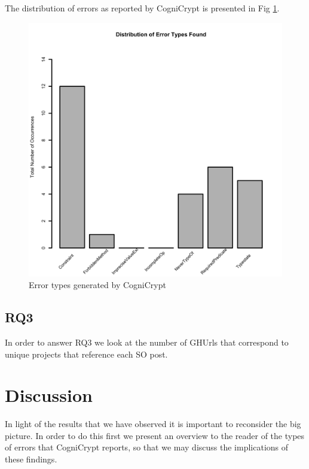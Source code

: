 \documentclass[10pt, conference]{IEEEtran}
\begin{document}
The distribution of errors as reported by CogniCrypt is presented in Fig \ref{fig:errorDistribution}.

\begin{figure}[h]
\begin{center}
\includegraphics[width=0.9\linewidth]{Dist.png}
\caption{Error types generated by CogniCrypt}
\label{fig:errorDistribution}
\end{center}
\end{figure}

\subsection{RQ3}

In order to answer RQ3 we look at the number of GHUrls that correspond to unique projects that reference each SO post. 


\section{Discussion}

In light of the results that we have observed it is important to reconsider the big picture. In order to do this first we present an overview to the reader of the types of errors that CogniCrypt reports, so that we may discuss the implications of these findings.
\end{document}
